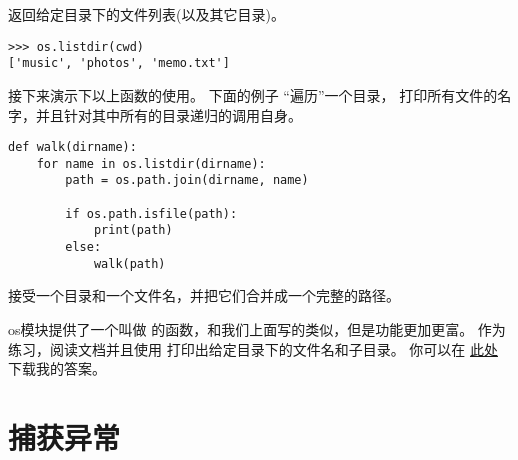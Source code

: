 {{{{{{{%

 返回给定目录下的文件列表(以及其它目录)。

\begin{lstlisting}
>>> os.listdir(cwd)
['music', 'photos', 'memo.txt']
\end{lstlisting}

%

接下来演示下以上函数的使用。 下面的例子 ``遍历''一个目录， 打印所有文件的名字，并且针对其中所有的目录递归的调用自身。

  

\begin{lstlisting}
def walk(dirname):
    for name in os.listdir(dirname):
        path = os.path.join(dirname, name)

        if os.path.isfile(path):
            print(path)
        else:
            walk(path)
\end{lstlisting}

%

 接受一个目录和一个文件名，并把它们合并成一个完整的路径。


os模块提供了一个叫做  的函数，和我们上面写的类似，但是功能更加更富。
作为练习，阅读文档并且使用  打印出给定目录下的文件名和子目录。
你可以在 \href{http://thinkpython2.com/code/walk.py}{此处} 下载我的答案。


\section{捕获异常}
\label{catch}

}}}}}}}
